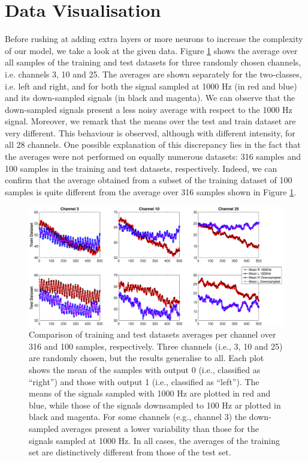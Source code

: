 \documentclass{article}
\begin{document}
 \section{Data Visualisation}\label{sec_visual}
 Before rushing at adding extra layers or more neurons to increase the complexity of our model, we  take a look at the given data. 
 Figure \ref{fig_mean_1000hz_vs_downsampled} shows the average over all samples of the training and test datasets for three randomly chosen channels, i.e. channels 3, 10 and 25. 
The averages are shown separately for the two-classes, i.e. left and right, and for both the signal sampled at 1000 Hz (in red and blue) and its down-sampled signals (in black and magenta). 
We can observe that the down-sampled signals present a less noisy average with respect to the 1000 Hz signal. 
Moreover, we remark that  the means over the test and train dataset are very different. 
This behaviour is observed, although with different intensity, for all 28 channels. 
One possible explanation of this discrepancy lies in the fact that the averages were not performed on equally numerous datasets: 316 samples and 100 samples in the training and test datasets, respectively. 
Indeed, we can confirm that the average obtained from a subset of the training dataset of 100 samples is quite different from the average over 316 samples shown in Figure \ref{fig_mean_1000hz_vs_downsampled}. 
%
 \begin{figure}[h]
 \begin{center}
  \includegraphics[width=1\textwidth]{fig/fig4new_mean_downsampled_vs1000} 
  \caption{Comparison of training and test datasets averages per channel over 316 and 100 samples, respectively.  
  Three channels (i.e., 3, 10 and 25) are randomly chosen, but the results generalise to all. 
  Each plot shows the mean of the samples with output 0 (i.e., classified as ``right'') and those with output 1 (i.e., classified as ``left''). 
  The means of the signals sampled with 1000 Hz are plotted in red and blue, while those of the signals downsampled to 100 Hz ar plotted in black and magenta. 
For some channels (e.g., channel 3) the down-sampled averages present a lower variability than those for the signals sampled at 1000 Hz. 
  In all cases, the averages of the training set are distinctively different from those of the test set. 
  \label{fig_mean_1000hz_vs_downsampled}}
  \end{center}
  \end{figure}
\end{document}
